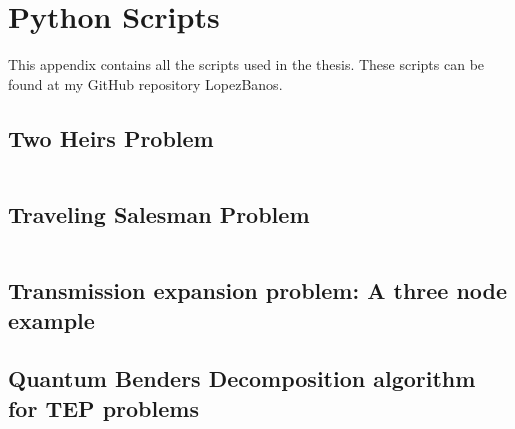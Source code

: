 
\chapter{Python Scripts} %

This appendix contains all the scripts used in the thesis. These scripts can be found at my GitHub repository LopezBanos.
\label{AppendixD} %
\section{Two Heirs Problem}
\inputminted[linenos]{python}{Scripts/Two_Heirs.py}
\section{Traveling Salesman Problem}
\inputminted[linenos]{python}{Scripts/tsp_simulated_annealing.py}
\section{Transmission expansion problem: A three node example}
\section{Quantum Benders Decomposition algorithm for TEP problems}